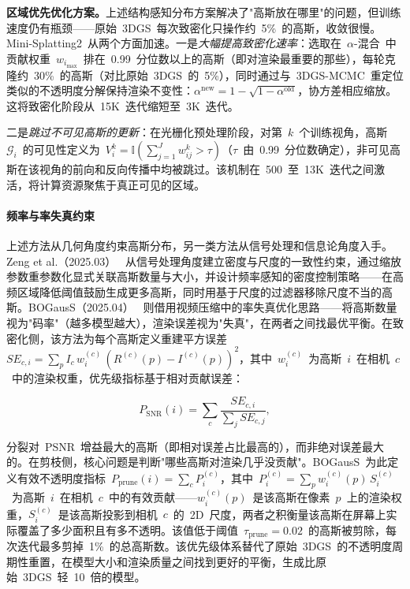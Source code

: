 \textbf{区域优先优化方案。}上述结构感知分布方案解决了"高斯放在哪里"的问题，但训练速度仍有瓶颈——原始~3DGS~每次致密化只操作约~5\%~的高斯，收敛很慢。Mini-Splatting2~从两个方面加速。一是\emph{大幅提高致密化速率}：选取在~$\alpha$-混合~中贡献权重~$w_{i_{\max}}$~排在~0.99~分位数以上的高斯（即对渲染最重要的那些），每轮克隆约~30\%~的高斯（对比原始~3DGS~的~5\%），同时通过与~3DGS-MCMC~重定位类似的不透明度分解保持渲染不变性：$\alpha^{\text{new}} = 1 - \sqrt{1 - \alpha^{\text{old}}}$，协方差相应缩放。这将致密化阶段从~15K~迭代缩短至~3K~迭代。

二是\emph{跳过不可见高斯的更新}：在光栅化预处理阶段，对第~$k$~个训练视角，高斯~$\mathcal{G}_i$~的可见性定义为~$V_i^k = \mathbb{I}(\sum_{j=1}^{J} w_{ij}^k > \tau)$（$\tau$~由~0.99~分位数确定），非可见高斯在该视角的前向和反向传播中均被跳过。该机制在~500~至~13K~迭代之间激活，将计算资源聚焦于真正可见的区域。

\paragraph{频率与率失真约束}

上述方法从几何角度约束高斯分布，另一类方法从信号处理和信息论角度入手。Zeng et al.（2025.03）~\cite{2503_07000} 从信号处理角度建立密度与尺度的一致性约束，通过缩放参数重参数化显式关联高斯数量与大小，并设计频率感知的密度控制策略——在高频区域降低阈值鼓励生成更多高斯，同时用基于尺度的过滤器移除尺度不当的高斯。BOGausS（2025.04）~\cite{2504_01844} 则借用视频压缩中的率失真优化思路——将高斯数量视为"码率"（越多模型越大），渲染误差视为"失真"，在两者之间找最优平衡。在致密化侧，该方法为每个高斯定义重建平方误差~$SE_{c,i} = \sum_p I_c\, w_i^{(c)}\,(R^{(c)}(p) - I^{(c)}(p))^2$，其中~$w_i^{(c)}$~为高斯~$i$~在相机~$c$~中的渲染权重，优先级指标基于相对贡献误差：

\[
P_{\text{SNR}}(i) = \sum_c \frac{SE_{c,i}}{\sum_j SE_{c,j}},
\]

分裂对~PSNR~增益最大的高斯（即相对误差占比最高的），而非绝对误差最大的。在剪枝侧，核心问题是判断"哪些高斯对渲染几乎没贡献"。BOGausS~为此定义有效不透明度指标~$P_{\text{prune}}(i) = \sum_c P_i^{(c)}$，其中~$P_i^{(c)} = \sum_p w_i^{(c)}(p)\, S_i^{(c)}$~为高斯~$i$~在相机~$c$~中的有效贡献——$w_i^{(c)}(p)$~是该高斯在像素~$p$~上的渲染权重，$S_i^{(c)}$~是该高斯投影到相机~$c$~的~2D~尺度，两者之积衡量该高斯在屏幕上实际覆盖了多少面积且有多不透明。该值低于阈值~$\tau_{\text{prune}} = 0.02$~的高斯被剪除，每次迭代最多剪掉~1\%~的总高斯数。该优先级体系替代了原始~3DGS~的不透明度周期性重置，在模型大小和渲染质量之间找到更好的平衡，生成比原始~3DGS~轻~10~倍的模型。

